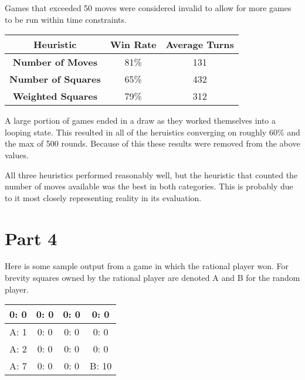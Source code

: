 \documentclass[12pt]{article}
\begin{document}
Games that exceeded 50 moves were considered invalid to allow for more games to be run within time constraints.

\begin{center}
\begin{tabular}{|c|c|c|} 
\hline
\textbf{Heuristic} & \textbf{Win Rate} & \textbf{Average Turns}  \\ \hline
\textbf{Number of Moves} & 81\% & 131  \\ \hline
\textbf{Number of Squares} & 65\% & 432  \\ \hline
\textbf{Weighted Squares} & 79\% & 312  \\ \hline
\end{tabular} 
\end{center}

A large portion of games ended in a draw as they worked themselves into a looping state. This resulted in all of the heruistics converging on roughly 60\% and the max of 500 rounds. Because of this these results were removed from the above values.

All three heuristics performed reasonably well, but the heuristic that counted the number of moves available was the best in both categories. This is probably due to it most closely representing reality in its evaluation. 

\section{Part 4}
Here is some sample output from a game in which the rational player won. For brevity squares owned by the rational player are denoted A and B for the random player. 

\begin{center}
\begin{tabular}{|c|c|c|c|} 
\hline
0: 0  & 0: 0  & 0: 0  & 0: 0  \\ \hline
A: 1  & 0: 0  & 0: 0  & 0: 0  \\ \hline
A: 2  & 0: 0  & 0: 0  & 0: 0  \\ \hline
A: 7  & 0: 0  & 0: 0  & B: 10  \\ \hline
\end{tabular} 
\end{center}
\end{document}
